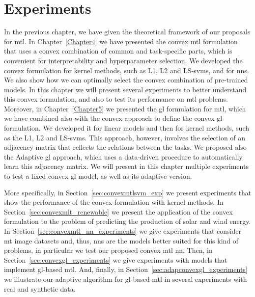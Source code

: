 
\chapter{Experiments} %
\label{Chapter6}


In the previous chapter, we have given the theoretical framework of our proposals for \acrfull{mtl}. In Chapter~\ref{Chapter4} we have presented the convex \acrshort{mtl} formulation that uses a convex combination of common and task-specific parts, which is convenient for interpretability and hyperparameter selection.
We developed the convex formulation for kernel methods, such as L1, L2 and LS-\acrfull{svms}, and for \acrfull{nns}. We also show how we can optimally select the convex combination of pre-trained models.
%
In this chapter we will present several experiments to better understand this convex formulation, and also to test its performance on \acrshort{mtl} problems.
%
Moreover, in Chapter~\ref{Chapter5} we presented the \acrfull{gl} formulation for \acrshort{mtl}, which we have combined also with the convex approach to define the convex \acrshort{gl} formulation.
We developed it for linear models and then for kernel methods, such as the L1, L2 and LS-\acrshort{svms}. This approach, however, involves the selection of an adjacency matrix that reflects the relations between the tasks. We proposed also the Adaptive \acrshort{gl} approach, which uses a data-driven procedure to automatically learn this adjacency matrix.
%
We will present in this chapter multiple experiments to test a fixed convex \acrshort{gl} model, as well as its adaptive version.
%

More specifically, in Section~\ref{sec:convexmtlsvm_exp} we present experiments that show the performance of the convex formulation with kernel methods. In Section~\ref{sec:convexmlt_renewable} we present the application of the convex formulation to the problem of predicting the production of solar and wind energy.
In Section~\ref{sec:convexmtl_nn_experiments} we give experiments that consider \acrfull{mt} image datasets and, thus, \acrshort{nns} are the models better suited for this kind of problems, in particular we test our proposed convex \acrshort{mtl} \acrshort{nn}. 
%
Then, in Section~\ref{sec:convexgl_experiments} we give experiments with models that implement \acrshort{gl}-based \acrshort{mtl}. And, finally, in Section~\ref{sec:adapconvexgl_experiments} we illustrate our adaptive algorithm for \acrshort{gl}-based \acrshort{mtl} in several experiments with real and synthetic data.






